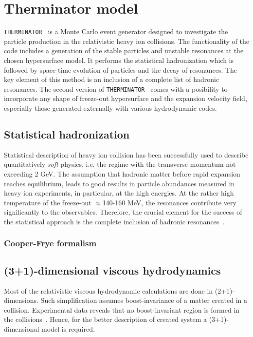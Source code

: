 \chapter{Therminator model}
  \verb|THERMINATOR|~\cite{therminator} is a Monte Carlo event generator designed to investigate the particle production in the relativistic heavy ion collisions.
  The functionality of the code includes a generation of the stable particles and unstable resonances at the chosen hypersurface model.
  It performs the statistical hadronization which is followed by space-time evolution of particles and the decay of resonances.
  The key element of this method is an inclusion of a complete list of hadronic resonances.
  The second version of \verb|THERMINATOR|~\cite{therminator2} comes with a posibility to incorporate any shape of freeze-out hypersurface and the expansion velocity field, especially those generated externally with various hydrodynamic codes.
  \section{Statistical hadronization}
    Statistical description of heavy ion collision has been successfully used to describe quantitatively \textit{soft} physics, i.e. the regime with the transverse momentum not exceeding 2 GeV.
    The assumption that hadronic matter before rapid expansion reaches equilibrium, leads to good results in particle abundances measured in heavy ion experiments, in particular, at the high energies.
    At the rather high temperature of the freeze-out $\approx$140-160 MeV, the resonances contribute very significantly to the observables.
    Therefore, the crucial element for the success of the statistical approach is the complete inclusion of hadronic resonances~\cite{therminator}.
    \subsection{Cooper-Frye formalism}

    \section{(3+1)-dimensional viscous hydrodynamics}
    Most of the relativistic viscous hydrodynamic calculations are done in \mbox{(2+1)-dimensions}.
    Such simplification assumes boost-invariance of a matter created in a collision.
    Experimental data reveals that no boost-invariant region is formed in the collisions~\cite{chmeson}.
    Hence, for the better description of created system a \mbox{(3+1)-dimensional} model is required.

